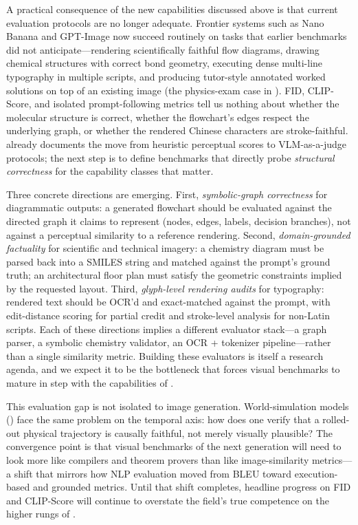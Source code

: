 \documentclass{llmxive}
\begin{document}
A practical consequence of the new capabilities discussed above is that current evaluation protocols are no longer adequate. Frontier systems such as Nano Banana and GPT-Image now succeed routinely on tasks that earlier benchmarks did not anticipate---rendering scientifically faithful flow diagrams, drawing chemical structures with correct bond geometry, executing dense multi-line typography in multiple scripts, and producing tutor-style annotated worked solutions on top of an existing image (the physics-exam case in ). FID, CLIP-Score, and isolated prompt-following metrics tell us nothing about whether the molecular structure is correct, whether the flowchart's edges respect the underlying graph, or whether the rendered Chinese characters are stroke-faithful.  already documents the move from heuristic perceptual scores to VLM-as-a-judge protocols; the next step is to define benchmarks that directly probe \emph{structural correctness} for the capability classes that matter.

Three concrete directions are emerging. First, \emph{symbolic-graph correctness} for diagrammatic outputs: a generated flowchart should be evaluated against the directed graph it claims to represent (nodes, edges, labels, decision branches), not against a perceptual similarity to a reference rendering. Second, \emph{domain-grounded factuality} for scientific and technical imagery: a chemistry diagram must be parsed back into a SMILES string and matched against the prompt's ground truth; an architectural floor plan must satisfy the geometric constraints implied by the requested layout. Third, \emph{glyph-level rendering audits} for typography: rendered text should be OCR'd and exact-matched against the prompt, with edit-distance scoring for partial credit and stroke-level analysis for non-Latin scripts. Each of these directions implies a different evaluator stack---a graph parser, a symbolic chemistry validator, an OCR + tokenizer pipeline---rather than a single similarity metric. Building these evaluators is itself a research agenda, and we expect it to be the bottleneck that forces visual benchmarks to mature in step with the capabilities of .

This evaluation gap is not isolated to image generation. World-simulation models () face the same problem on the temporal axis: how does one verify that a rolled-out physical trajectory is causally faithful, not merely visually plausible? The convergence point is that visual benchmarks of the next generation will need to look more like compilers and theorem provers than like image-similarity metrics---a shift that mirrors how NLP evaluation moved from BLEU toward execution-based and grounded metrics. Until that shift completes, headline progress on FID and CLIP-Score will continue to overstate the field's true competence on the higher rungs of .
\end{document}
